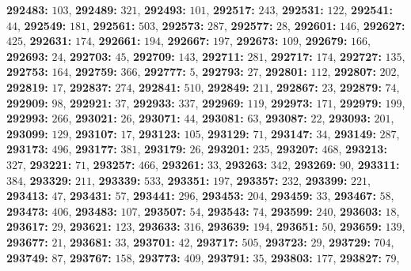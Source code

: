 \textsf{\bfseries 292483:} $103$, \textsf{\bfseries 292489:} $321$, \textsf{\bfseries 292493:} $101$, \textsf{\bfseries 292517:} $243$, \textsf{\bfseries 292531:} $122$, \textsf{\bfseries 292541:} $44$, \textsf{\bfseries 292549:} $181$, \textsf{\bfseries 292561:} $503$, \textsf{\bfseries 292573:} $287$, \textsf{\bfseries 292577:} $28$, \textsf{\bfseries 292601:} $146$, \textsf{\bfseries 292627:} $425$, \textsf{\bfseries 292631:} $174$, \textsf{\bfseries 292661:} $194$, \textsf{\bfseries 292667:} $197$, \textsf{\bfseries 292673:} $109$, \textsf{\bfseries 292679:} $166$, \textsf{\bfseries 292693:} $24$, \textsf{\bfseries 292703:} $45$, \textsf{\bfseries 292709:} $143$, \textsf{\bfseries 292711:} $281$, \textsf{\bfseries 292717:} $174$, \textsf{\bfseries 292727:} $135$, \textsf{\bfseries 292753:} $164$, \textsf{\bfseries 292759:} $366$, \textsf{\bfseries 292777:} $5$, \textsf{\bfseries 292793:} $27$, \textsf{\bfseries 292801:} $112$, \textsf{\bfseries 292807:} $202$, \textsf{\bfseries 292819:} $17$, \textsf{\bfseries 292837:} $274$, \textsf{\bfseries 292841:} $510$, \textsf{\bfseries 292849:} $211$, \textsf{\bfseries 292867:} $23$, \textsf{\bfseries 292879:} $74$, \textsf{\bfseries 292909:} $98$, \textsf{\bfseries 292921:} $37$, \textsf{\bfseries 292933:} $337$, \textsf{\bfseries 292969:} $119$, \textsf{\bfseries 292973:} $171$, \textsf{\bfseries 292979:} $199$, \textsf{\bfseries 292993:} $266$, \textsf{\bfseries 293021:} $26$, \textsf{\bfseries 293071:} $44$, \textsf{\bfseries 293081:} $63$, \textsf{\bfseries 293087:} $22$, \textsf{\bfseries 293093:} $201$, \textsf{\bfseries 293099:} $129$, \textsf{\bfseries 293107:} $17$, \textsf{\bfseries 293123:} $105$, \textsf{\bfseries 293129:} $71$, \textsf{\bfseries 293147:} $34$, \textsf{\bfseries 293149:} $287$, \textsf{\bfseries 293173:} $496$, \textsf{\bfseries 293177:} $381$, \textsf{\bfseries 293179:} $26$, \textsf{\bfseries 293201:} $235$, \textsf{\bfseries 293207:} $468$, \textsf{\bfseries 293213:} $327$, \textsf{\bfseries 293221:} $71$, \textsf{\bfseries 293257:} $466$, \textsf{\bfseries 293261:} $33$, \textsf{\bfseries 293263:} $342$, \textsf{\bfseries 293269:} $90$, \textsf{\bfseries 293311:} $384$, \textsf{\bfseries 293329:} $211$, \textsf{\bfseries 293339:} $533$, \textsf{\bfseries 293351:} $197$, \textsf{\bfseries 293357:} $232$, \textsf{\bfseries 293399:} $221$, \textsf{\bfseries 293413:} $47$, \textsf{\bfseries 293431:} $57$, \textsf{\bfseries 293441:} $296$, \textsf{\bfseries 293453:} $204$, \textsf{\bfseries 293459:} $33$, \textsf{\bfseries 293467:} $58$, \textsf{\bfseries 293473:} $406$, \textsf{\bfseries 293483:} $107$, \textsf{\bfseries 293507:} $54$, \textsf{\bfseries 293543:} $74$, \textsf{\bfseries 293599:} $240$, \textsf{\bfseries 293603:} $18$, \textsf{\bfseries 293617:} $29$, \textsf{\bfseries 293621:} $123$, \textsf{\bfseries 293633:} $316$, \textsf{\bfseries 293639:} $194$, \textsf{\bfseries 293651:} $50$, \textsf{\bfseries 293659:} $139$, \textsf{\bfseries 293677:} $21$, \textsf{\bfseries 293681:} $33$, \textsf{\bfseries 293701:} $42$, \textsf{\bfseries 293717:} $505$, \textsf{\bfseries 293723:} $29$, \textsf{\bfseries 293729:} $704$, \textsf{\bfseries 293749:} $87$, \textsf{\bfseries 293767:} $158$, \textsf{\bfseries 293773:} $409$, \textsf{\bfseries 293791:} $35$, \textsf{\bfseries 293803:} $177$, \textsf{\bfseries 293827:} $79$, 
